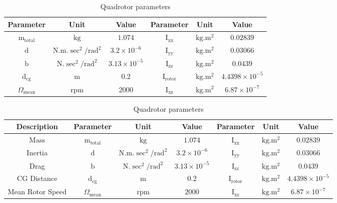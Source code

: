 \documentclass[3p]{elsarticle}
\begin{document}


\begin{table}[H]
    \centering
    \caption{Quadrotor parameters}
    \vspace{-0.5cm}
    \renewcommand{\arraystretch}{1.3}
    \begin{center}
    \begin{tabular}{c c c c c c}
    \hline
    Parameter & Unit & Value & Parameter & Unit & Value \\
    \hline
    $\mathrm{m}_{\text{total}}$ & $\mathrm{kg}$ & $1.074$ & $\mathrm{I}_{\text{xx}}$ & $\mathrm{kg.m^2}$ & $0.02839$ \\ 
    $\mathrm{d}$ & $\mathrm{N.m.\sec^2/rad^2}$ & $3.2\times10^{-6}$ &
    $\mathrm{I}_{\text{yy}}$ & $\mathrm{kg.m^2}$ & $0.03066$ \\
    $\mathrm{b}$ & $\mathrm{N.\sec^2/rad^2}$ & $3.13\times10^{-5}$ 
    & $\mathrm{I}_{\text{zz}}$ & $\mathrm{kg.m^2}$ & $0.0439$ \\
    $\mathrm{d}_{\text{cg}}$ & $\mathrm{m}$ & $0.2$ & $\mathrm{I}_{\text{rotor}}$ & $\mathrm{kg.m^2}$ & $4.4398\times 10^{-5}$ \\
    $\Omega_{\text{mean}}$ & $\mathrm{rpm}$ & $2000$ & $\mathrm{I}_{\text{xz}}$ & $\mathrm{kg.m^2}$ & $6.87\times 10^{-7}$ \\
    \hline
\end{tabular}
\label{tab:parameters}
\end{center}
\end{table}


\begin{table}[H]
    \centering
    \caption{Quadrotor parameters}
    \vspace{-0.5cm}
    \renewcommand{\arraystretch}{1.3}
    \begin{center}
    \begin{tabular}{c c c c c c c}
    \hline
    Description & Parameter & Unit & Value & Parameter & Unit & Value \\
    \hline
    Mass & $\mathrm{m}_{\text{total}}$ & $\mathrm{kg}$ & $1.074$ & $\mathrm{I}_{\text{xx}}$ & $\mathrm{kg.m^2}$ & $0.02839$ \\ 
    Inertia & $\mathrm{d}$ & $\mathrm{N.m.\sec^2/rad^2}$ & $3.2\times10^{-6}$ &
    $\mathrm{I}_{\text{yy}}$ & $\mathrm{kg.m^2}$ & $0.03066$ \\
    Drag & $\mathrm{b}$ & $\mathrm{N.\sec^2/rad^2}$ & $3.13\times10^{-5}$ 
    & $\mathrm{I}_{\text{zz}}$ & $\mathrm{kg.m^2}$ & $0.0439$ \\
    CG Distance & $\mathrm{d}_{\text{cg}}$ & $\mathrm{m}$ & $0.2$ & $\mathrm{I}_{\text{rotor}}$ & $\mathrm{kg.m^2}$ & $4.4398\times 10^{-5}$ \\
    Mean Rotor Speed & $\Omega_{\text{mean}}$ & $\mathrm{rpm}$ & $2000$ & $\mathrm{I}_{\text{xz}}$ & $\mathrm{kg.m^2}$ & $6.87\times 10^{-7}$ \\
    \hline
\end{tabular}
\label{tab:parameters}
\end{center}
\end{table}
\end{document}
